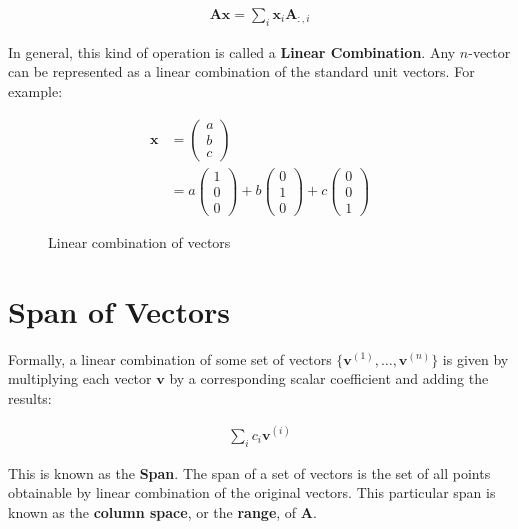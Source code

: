 \begin{align}
\mathbf{A}\mathbf{x} = \sum_{i} \mathbf{x}_{i} \mathbf{A}_{:,i}
\end{align}

\para

In general, this kind of operation is called a \textbf{Linear Combination}. Any \(n\)-vector can be represented as a linear combination of the standard unit vectors. For example:

\begin{align}
\mathbf{x} &= \begin{pmatrix} a \\ b \\ c \end{pmatrix} \\
&= a \begin{pmatrix} 1 \\ 0 \\ 0 \end{pmatrix} + b \begin{pmatrix} 0 \\ 1 \\ 0 \end{pmatrix} + c \begin{pmatrix} 0 \\ 0 \\ 1 \end{pmatrix}
\end{align}

\begin{figure}[ht]
    \centering
    
    \caption{Linear combination of vectors}
    \label{Vector span}
\end{figure}

\clearpage
\newpage

\section{Span of Vectors}

Formally, a linear combination of some set of vectors \(\{\mathbf{v}^{(1)}, \ldots, \mathbf{v}^{(n)}\}\) is given by multiplying each vector \(\mathbf{v}\) by a corresponding scalar coefficient and adding the results:

\begin{align}
\sum_{i} c_{i} \mathbf{v}^{(i)}
\end{align}

This is known as the \textbf{Span}. The span of a set of vectors is the set of all points obtainable by linear combination of the original vectors. This particular span is known as the \textbf{column space}, or the \textbf{range}, of \(\mathbf{A}\).

